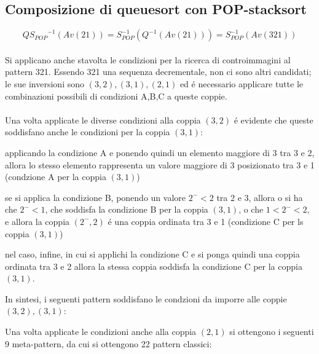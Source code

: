 \subsection*{Composizione di {queuesort} con {POP-stacksort}}
$$Q{S_{POP}}^{-1}(Av(21)) = S_{POP}^{-1}(Q^{-1}(Av(21))) = S_{POP}^{-1}(Av(321))$$
\\Si applicano anche stavolta le condizioni per la ricerca di controimmagini al pattern 321. Essendo 321 una sequenza decrementale, non ci sono altri candidati; le sue inversioni sono $(3,2),(3,1),(2,1)$ ed \'e necessario applicare tutte le combinazioni possibili di condizioni A,B,C a queste coppie.\\\\
Una volta applicate le diverse condizioni alla coppia $(3,2)$ \'e evidente che queste soddisfano anche le condizioni per la coppia $(3,1)$:
\begin{description}
	\item applicando la condizione A e ponendo quindi un elemento maggiore di 3 tra 3 e 2, allora lo stesso elemento rappresenta un valore maggiore di 3 posizionato tra 3 e 1 (condzione A per la coppia $(3,1)$)
	\item se si applica la condizione B, ponendo un valore $2^-<2$ tra 2 e 3, allora o si ha che $2^-<1$, che soddisfa la condizione B per la coppia $(3,1)$, o che $1<2^-<2$, e allora la coppia $(2^-,2)$ \'e una coppia ordinata tra 3 e 1 (condizione C per ls coppia $(3,1)$)
	\item nel caso, infine, in cui si applichi la condizione C e si ponga quindi una coppia ordinata tra 3 e 2 allora la stessa coppia soddisfa la condizione C per la coppia $(3,1)$.
\end{description}
In sintesi, i seguenti pattern soddisfano le condzioni da imporre alle coppie $(3,2),(3,1)$:
\begin{center}
\end{center}
Una volta applicate le condizioni anche alla coppia $(2,1)$ si ottengono i seguenti 9 meta-pattern, da cui si ottengono 22 pattern classici:
\begin{center}
\end{center}
